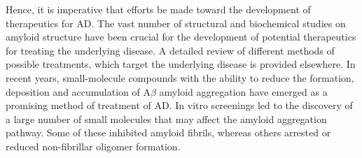 

Hence, it is imperative that efforts be made toward the development of therapeutics for AD. The vast number of structural and biochemical studies on amyloid structure have been crucial for the development of potential therapeutics for treating the underlying disease. A detailed review of different methods of possible treatments, which target the underlying disease is provided elsewhere.\cite{Salomone:2012fh} In recent years, small-molecule compounds with the ability to reduce the formation, deposition and accumulation of A$\beta$ amyloid aggregation have emerged as a promising method of treatment of AD. 
In vitro screenings led to the discovery of a large number of small molecules that may affect the amyloid aggregation pathway.\cite{Ryan:2012bh} Some of these inhibited amyloid fibrils, whereas others arrested or reduced non-fibrillar oligomer formation.\cite{Necula:2007p5049,LeVine:2007jd} %

